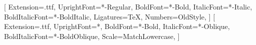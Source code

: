 \usepackage[eulerchapternumbers, listings, style=linedheaders,
pdfspacing]{classicthesis}

\setmainfont{CharisSIL}[
  Extension=.ttf,
  UprightFont=*-Regular,
  BoldFont=*-Bold,
  ItalicFont=*-Italic,
  BoldItalicFont=*-BoldItalic,
  Ligatures=TeX,
  Numbers=OldStyle,
]
\setmonofont{DejaVuSansMono}[
  Extension=.ttf,
  UprightFont=*,
  BoldFont=*-Bold,
  ItalicFont=*-Oblique,
  BoldItalicFont=*-BoldOblique,
  Scale=MatchLowercase,
]

%
%
%
%
%
%


